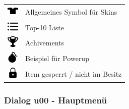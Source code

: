 \begin{center}
\begin{tabular}{ll}
        \includegraphics[width=1.5em,height=1.5em]{diagramme/assets/Shirt-256.png} & Allgemeines Symbol für Skins \\
        \includegraphics[width=1.5em,height=1.5em]{diagramme/assets/list.png} & Top-10 Liste \\
        \includegraphics[width=1.5em,height=1.5em]{diagramme/assets/Trophy-256.png} & Achivements \\
        \includegraphics[width=1.5em,height=1.5em]{diagramme/assets/Bomb-256.png} & Beispiel für Powerup \\    
        \includegraphics[width=1.5em,height=1.5em]{diagramme/assets/Lock-256.png} & Item gesperrt / nicht im Besitz
    \end{tabular}
\end{center}
\setlength{\extrarowheight}{0.5em}

\clearpage

\subsubsection{Dialog u00 - Hauptmenü}


